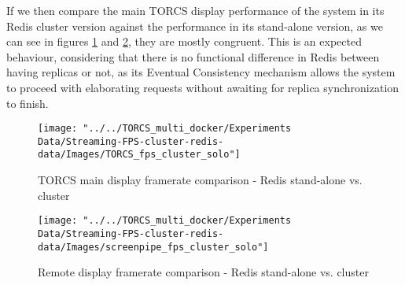 If we then compare the main TORCS display performance of the system in its Redis cluster version against the performance in its stand-alone version, as we can see in figures \ref{fig:torcs-fps-cluster-solo-redis} and \ref{fig:screenpipe-fps-cluster-solo-redis}, they are mostly congruent. This is an expected behaviour, considering that there is no functional difference in Redis between having replicas or not, as its Eventual Consistency mechanism allows the system to proceed with elaborating requests without awaiting for replica synchronization to finish.
\begin{figure}[h!]
	\centering
	\texttt{[image: "../../TORCS\_multi\_docker/Experiments Data/Streaming-FPS-cluster-redis-data/Images/TORCS\_fps\_cluster\_solo"]}
	\caption[TORCS main display framerate comparison - Redis stand-alone vs. cluster]{TORCS main display framerate comparison - Redis stand-alone vs. cluster}
	\label{fig:torcs-fps-cluster-solo-redis}
\end{figure}
\begin{figure}[h!]
	\centering
	\texttt{[image: "../../TORCS\_multi\_docker/Experiments Data/Streaming-FPS-cluster-redis-data/Images/screenpipe\_fps\_cluster\_solo"]}
	\caption[Remote display framerate comparison - Redis stand-alone vs. cluster]{Remote display framerate comparison - Redis stand-alone vs. cluster}
	\label{fig:screenpipe-fps-cluster-solo-redis}
\end{figure}

\pagebreak

